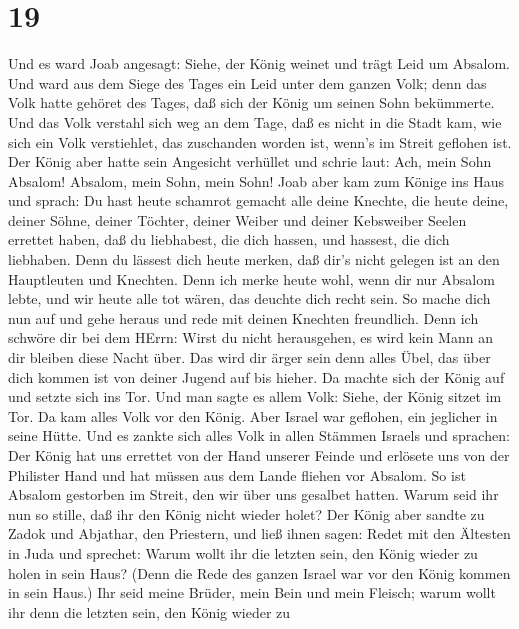 \hypertarget{section-18}{%
\section{19}\label{section-18}}

 Und es ward Joab angesagt: Siehe, der König weinet und
trägt Leid um Absalom.  Und ward aus dem Siege des Tages ein
Leid unter dem ganzen Volk; denn das Volk hatte gehöret des Tages, daß
sich der König um seinen Sohn bekümmerte.  Und das Volk
verstahl sich weg an dem Tage, daß es nicht in die Stadt kam, wie sich
ein Volk verstiehlet, das zuschanden worden ist, wenn's im Streit
geflohen ist.  Der König aber hatte sein Angesicht verhüllet
und schrie laut: Ach, mein Sohn Absalom! Absalom, mein Sohn, mein Sohn!
 Joab aber kam zum Könige ins Haus und sprach: Du hast heute
schamrot gemacht alle deine Knechte, die heute deine, deiner Söhne,
deiner Töchter, deiner Weiber und deiner Kebsweiber Seelen errettet
haben,  daß du liebhabest, die dich hassen, und hassest, die
dich liebhaben. Denn du lässest dich heute merken, daß dir's nicht
gelegen ist an den Hauptleuten und Knechten. Denn ich merke heute wohl,
wenn dir nur Absalom lebte, und wir heute alle tot wären, das deuchte
dich recht sein.  So mache dich nun auf und gehe heraus und
rede mit deinen Knechten freundlich. Denn ich schwöre dir bei dem HErrn:
Wirst du nicht herausgehen, es wird kein Mann an dir bleiben diese Nacht
über. Das wird dir ärger sein denn alles Übel, das über dich kommen ist
von deiner Jugend auf bis hieher.  Da machte sich der König
auf und setzte sich ins Tor. Und man sagte es allem Volk: Siehe, der
König sitzet im Tor. Da kam alles Volk vor den König. Aber Israel war
geflohen, ein jeglicher in seine Hütte.  Und es zankte sich
alles Volk in allen Stämmen Israels und sprachen: Der König hat uns
errettet von der Hand unserer Feinde und erlösete uns von der Philister
Hand und hat müssen aus dem Lande fliehen vor Absalom.  So
ist Absalom gestorben im Streit, den wir über uns gesalbet hatten. Warum
seid ihr nun so stille, daß ihr den König nicht wieder holet?
 Der König aber sandte zu Zadok und Abjathar, den
Priestern, und ließ ihnen sagen: Redet mit den Ältesten in Juda und
sprechet: Warum wollt ihr die letzten sein, den König wieder zu holen in
sein Haus? (Denn die Rede des ganzen Israel war vor den König kommen in
sein Haus.)  Ihr seid meine Brüder, mein Bein und mein
Fleisch; warum wollt ihr denn die letzten sein, den König wieder zu
